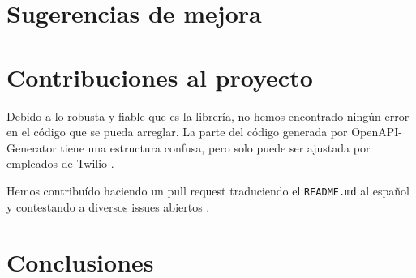 \documentclass{article}
\begin{document}
\section{Sugerencias de mejora}

\section{Contribuciones al proyecto}

Debido a lo robusta y fiable que es la librería,
no hemos encontrado ningún error en el código que se pueda arreglar.
La parte del código generada por OpenAPI-Generator
tiene una estructura confusa,
pero solo puede ser ajustada por empleados de Twilio \cite{contributing}.

Hemos contribuído haciendo un pull request
traduciendo el \verb|README.md| al español
\cite{contribución-readme}
y contestando a diversos issues abiertos
\cite{contribución-repeated-code}
\cite{contribución-security-improvements}
\cite{contribución-wrong-login}.

\section{Conclusiones}

\newpage

\printbibliography
\end{document}
